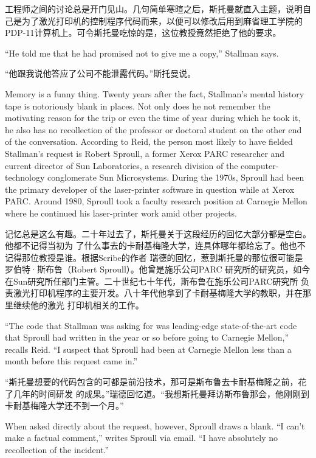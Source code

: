 \ifdefined\chs
工程师之间的讨论总是开门见山。几句简单寒暄之后，斯托曼就直入主题，说明自己是为了激光打印机的控制程序代码而来，以便可以修改后用到麻省理工学院的PDP-11计算机上。可令斯托曼吃惊的是，这位教授竟然拒绝了他的要求。
\fi

\ifdefined\eng
``He told me that he had promised not to give me a copy,'' Stallman says.
\fi

\ifdefined\chs
``他跟我说他答应了公司不能泄露代码。''斯托曼说。
\fi

\ifdefined\eng
Memory is a funny thing. Twenty years after the fact, Stallman's mental history tape is notoriously blank in places. Not only does he not remember the motivating reason for the trip or even the time of year during which he took it, he also has no recollection of the professor or doctoral student on the other end of the conversation. According to Reid, the person most likely to have fielded Stallman's request is Robert Sproull, a former Xerox PARC researcher and current director of Sun Laboratories, a research division of the computer-technology conglomerate Sun Microsystems. During the 1970s, Sproull had been the primary developer of the laser-printer software in question while at Xerox PARC. Around 1980, Sproull took a faculty research position at Carnegie Mellon where he continued his laser-printer work amid other projects.
\fi

\ifdefined\chs
记忆总是这么有趣。二十年过去了，斯托曼关于这段经历的回忆大部分都是空白。他都不记得当初为
了什么事去的卡耐基梅隆大学，连具体哪年都给忘了。他也不记得那位教授是谁。根据Scribe的作者
瑞德的回忆，惹到斯托曼的那位很可能是罗伯特·斯布鲁（Robert Sproull）。他曾是施乐公司PARC
研究所的研究员，如今在Sun研究所任部门主管。二十世纪七十年代，斯布鲁在施乐公司PARC研究所
负责激光打印机程序的主要开发。八十年代他拿到了卡耐基梅隆大学的教职，并在那里继续他的激光
打印机相关的工作。
\fi

\ifdefined\eng
``The code that Stallman was asking for was leading-edge state-of-the-art code that Sproull had written in the year or so before going to Carnegie Mellon,'' recalls Reid. ``I suspect that Sproull had been at Carnegie Mellon less than a month before this request came in.''
\fi

\ifdefined\chs
``斯托曼想要的代码包含的可都是前沿技术，那可是斯布鲁去卡耐基梅隆之前，花了几年的时间研发
的成果。''瑞德回忆道。``我想斯托曼拜访斯布鲁那会，他刚刚到卡耐基梅隆大学还不到一个月。''
\fi

\ifdefined\eng
When asked directly about the request, however, Sproull draws a blank. ``I can't make a factual comment,'' writes Sproull via email. ``I have absolutely no recollection of the incident.''
\fi

